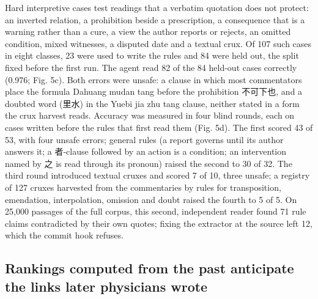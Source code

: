 \documentclass[
]{article}
\begin{document}
Hard interpretive cases test readings that a verbatim quotation does not
protect: an inverted relation, a prohibition beside a prescription, a
consequence that is a warning rather than a cure, a view the author
reports or rejects, an omitted condition, mixed witnesses, a disputed
date and a textual crux. Of 107 such cases in eight classes, 23 were
used to write the rules and 84 were held out, the split fixed before the
first run. The agent read 82 of the 84 held-out cases correctly (0.976;
Fig. 5c). Both errors were unsafe: a clause in which most commentators
place the formula Dahuang mudan tang before the prohibition 不可下也,
and a doubted word (里水) in the Yuebi jia zhu tang clause, neither
stated in a form the crux harvest reads. Accuracy was measured in four
blind rounds, each on cases written before the rules that first read
them (Fig. 5d). The first scored 43 of 53, with four unsafe errors;
general rules (a report governs until its author answers it; a 者-clause
followed by an action is a condition; an intervention named by 之 is
read through its pronoun) raised the second to 30 of 32. The third round
introduced textual cruxes and scored 7 of 10, three unsafe; a registry
of 127 cruxes harvested from the commentaries by rules for
transposition, emendation, interpolation, omission and doubt raised the
fourth to 5 of 5. On 25,000 passages of the full corpus, this second,
independent reader found 71 rule claims contradicted by their own
quotes; fixing the extractor at the source left 12, which the commit
hook refuses.

\hypertarget{rankings-computed-from-the-past-anticipate-the-links-later-physicians-wrote}{%
\subsection{Rankings computed from the past anticipate the links later
physicians
wrote}\label{rankings-computed-from-the-past-anticipate-the-links-later-physicians-wrote}}
\end{document}
